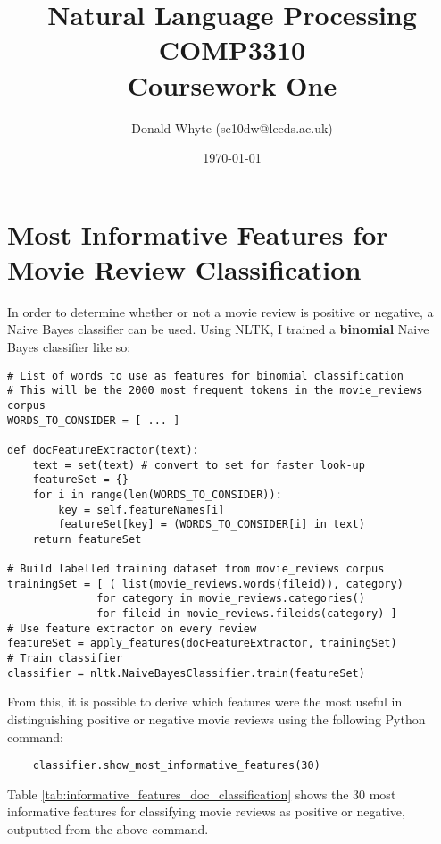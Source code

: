 \documentclass{article}
\title{Natural Language Processing \\ COMP3310 \\ Coursework One}
\author{Donald Whyte (sc10dw@leeds.ac.uk)}
\date{\today}
\begin{document}
\lstset{language=Python}
\lstset{basicstyle=\ttfamily}

\maketitle

\section{Most Informative Features for Movie Review Classification}

In order to determine whether or not a movie review is positive or negative, a Naive Bayes classifier can be used. Using NLTK, I trained a \textbf{binomial} Naive Bayes classifier like so:

%
%

\begin{lstlisting}
# List of words to use as features for binomial classification
# This will be the 2000 most frequent tokens in the movie_reviews corpus
WORDS_TO_CONSIDER = [ ... ]

def docFeatureExtractor(text):
	text = set(text) # convert to set for faster look-up
	featureSet = {}
	for i in range(len(WORDS_TO_CONSIDER)):
		key = self.featureNames[i]
		featureSet[key] = (WORDS_TO_CONSIDER[i] in text)
	return featureSet

# Build labelled training dataset from movie_reviews corpus
trainingSet = [ ( list(movie_reviews.words(fileid)), category)
			  for category in movie_reviews.categories()
			  for fileid in movie_reviews.fileids(category) ] 
# Use feature extractor on every review
featureSet = apply_features(docFeatureExtractor, trainingSet)
# Train classifier 
classifier = nltk.NaiveBayesClassifier.train(featureSet)
\end{lstlisting}

From this, it is possible to derive which features were the most useful in distinguishing positive or negative movie reviews using the following Python command:

\begin{lstlisting}
	classifier.show_most_informative_features(30)
\end{lstlisting}
Table \ref{tab:informative_features_doc_classification} shows the 30 most informative features for classifying movie reviews as positive or negative, outputted from the above command.
\end{document}

